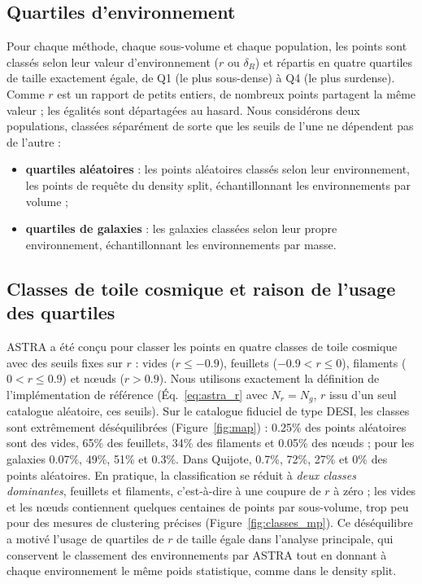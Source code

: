 \subsection{Quartiles d'environnement}

Pour chaque méthode, chaque sous-volume et chaque population, les points sont classés selon leur valeur d'environnement ($r$ ou $\delta_R$) et répartis en quatre quartiles de taille exactement égale, de Q1 (le plus sous-dense) à Q4 (le plus surdense). Comme $r$ est un rapport de petits entiers, de nombreux points partagent la même valeur ; les égalités sont départagées au hasard. Nous considérons deux populations, classées séparément de sorte que les seuils de l'une ne dépendent pas de l'autre :
\begin{itemize}
\item \textbf{quartiles aléatoires} : les points aléatoires classés selon leur environnement, les points de requête du density split, échantillonnant les environnements par volume ;
\item \textbf{quartiles de galaxies} : les galaxies classées selon leur propre environnement, échantillonnant les environnements par masse.
\end{itemize}

\subsection{Classes de toile cosmique et raison de l'usage des quartiles}
\label{sec:classes_def}

ASTRA a été conçu pour classer les points en quatre classes de toile cosmique avec des seuils fixes sur $r$ \cite{ASTRA} : vides ($r\le-0.9$), feuillets ($-0.9<r\le0$), filaments ($0<r\le0.9$) et nœuds ($r>0.9$). Nous utilisons exactement la définition de l'implémentation de référence (Éq.~\ref{eq:astra_r} avec $N_r=N_g$, $r$ issu d'un seul catalogue aléatoire, ces seuils). Sur le catalogue fiduciel de type DESI, les classes sont extrêmement déséquilibrées (Figure~\ref{fig:map}) : 0.25\% des points aléatoires sont des vides, 65\% des feuillets, 34\% des filaments et 0.05\% des nœuds ; pour les galaxies 0.07\%, 49\%, 51\% et 0.3\%. Dans Quijote, 0.7\%, 72\%, 27\% et 0\% des points aléatoires. En pratique, la classification se réduit à \emph{deux classes dominantes}, feuillets et filaments, c'est-à-dire à une coupure de $r$ à zéro ; les vides et les nœuds contiennent quelques centaines de points par sous-volume, trop peu pour des mesures de clustering précises (Figure~\ref{fig:classes_mp}). Ce déséquilibre a motivé l'usage de quartiles de $r$ de taille égale dans l'analyse principale, qui conservent le classement des environnements par ASTRA tout en donnant à chaque environnement le même poids statistique, comme dans le density split.

